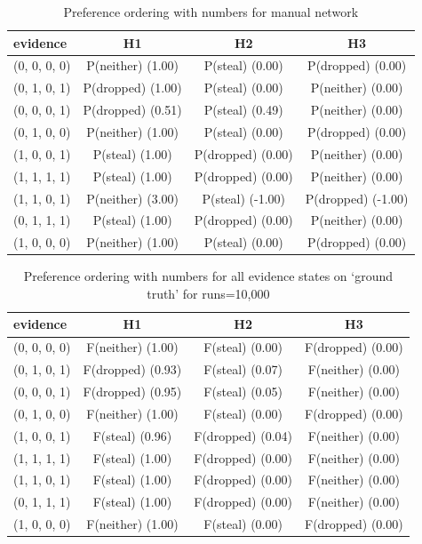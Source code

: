 \documentclass[12pt]{article}
\begin{document}
\begin{table}
\centering
\small
\begin{tabular}{|l|c|c|c|}
\hline
evidence & H1 & H2 & H3 \\
\hline
(0, 0, 0, 0)&P(neither) (1.00) & P(steal) (0.00) & P(dropped) (0.00) \\
(0, 1, 0, 1)&P(dropped) (1.00) & P(steal) (0.00) & P(neither) (0.00) \\
(0, 0, 0, 1)&P(dropped) (0.51) & P(steal) (0.49) & P(neither) (0.00) \\
(0, 1, 0, 0)&P(neither) (1.00) & P(steal) (0.00) & P(dropped) (0.00) \\
(1, 0, 0, 1)&P(steal) (1.00) & P(dropped) (0.00) & P(neither) (0.00) \\
(1, 1, 1, 1)&P(steal) (1.00) & P(dropped) (0.00) & P(neither) (0.00) \\
(1, 1, 0, 1)&P(neither) (3.00) & P(steal) (-1.00) & P(dropped) (-1.00) \\
(0, 1, 1, 1)&P(steal) (1.00) & P(dropped) (0.00) & P(neither) (0.00) \\
(1, 0, 0, 0)&P(neither) (1.00) & P(steal) (0.00) & P(dropped) (0.00) \\
\hline
\end{tabular}
\caption{ Preference ordering with numbers for manual network}
\label{ wife}
\end{table}%
\begin{table}
\centering
\small
\begin{tabular}{|l|c|c|c|}
\hline
evidence & H1 & H2 & H3 \\
\hline
(0, 0, 0, 0)&F(neither) (1.00) & F(steal) (0.00) & F(dropped) (0.00) \\
(0, 1, 0, 1)&F(dropped) (0.93) & F(steal) (0.07) & F(neither) (0.00) \\
(0, 0, 0, 1)&F(dropped) (0.95) & F(steal) (0.05) & F(neither) (0.00) \\
(0, 1, 0, 0)&F(neither) (1.00) & F(steal) (0.00) & F(dropped) (0.00) \\
(1, 0, 0, 1)&F(steal) (0.96) & F(dropped) (0.04) & F(neither) (0.00) \\
(1, 1, 1, 1)&F(steal) (1.00) & F(dropped) (0.00) & F(neither) (0.00) \\
(1, 1, 0, 1)&F(steal) (1.00) & F(dropped) (0.00) & F(neither) (0.00) \\
(0, 1, 1, 1)&F(steal) (1.00) & F(dropped) (0.00) & F(neither) (0.00) \\
(1, 0, 0, 0)&F(neither) (1.00) & F(steal) (0.00) & F(dropped) (0.00) \\
\hline
\end{tabular}
\caption{ Preference ordering with numbers for all evidence states on `ground truth' for runs=10,000}
\label{heretic}
\end{table}
\end{document}
